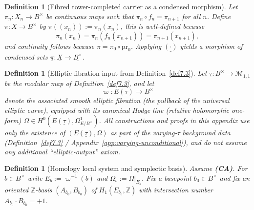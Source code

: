 \documentclass[11pt]{article}
\newtheorem{definition}[theorem]{Definition}
\theoremstyle{remark}
\begin{document}
{\begin{definition}[Fibred tower-completed carrier as a condensed morphism]\label{def:fibred_tower_condensed}
Let $\pi_n:X_n\to B^\times$ be continuous maps such that $\pi_n\circ f_n=\pi_{n+1}$ for all $n$. Define $\pi:X\to B^\times$ by $\pi((x_n)):=\pi_n(x_n)$, this is well-defined because
\begin{equation}\label{eq:pi_well_defined}
\pi_n(x_n)=\pi_n(f_n(x_{n+1}))=\pi_{n+1}(x_{n+1}),
\end{equation}
and continuity follows because $\pi=\pi_0\circ \mathrm{pr}_0$. Applying $\underline{(\cdot)}$ yields a morphism of condensed sets $\underline{\pi}:\underline{X}\to \underline{B^\times}$.
\end{definition} 
\begin{definition}[Elliptic fibration input from Definition~\eqref{def7.3}]\label{def:comparison_axiom_varying_tau}
Let $\underline{\tau}:B^\times\to \mathcal{M}_{1,1}$
be the modular map of Definition~\eqref{def7.3}, and let
\begin{equation}\label{eq:AppE-E-of-tau}
\varpi:E(\underline{\tau})\to B^\times
\end{equation}
denote the associated smooth elliptic fibration (the pullback of the universal elliptic curve), equipped with
its canonical Hodge line (relative holomorphic one-form) $\Omega\in H^0(E(\underline{\tau}),\Omega^1_{E/B^\times})$.
All constructions and proofs in this appendix use only the existence of $(E(\underline{\tau}),\Omega)$ as part of the
varying-$\tau$ background data (Definition~\eqref{def7.3} / Appendix~\eqref{app:varying-unconditional}), and do not assume any additional “elliptic-output”
axiom.
\end{definition}

\begin{definition}[Homology local system and symplectic basis]\label{def:homology_local_system}
Assume \textbf{(CA)}. For $b\in B^\times$ write $E_b:=\varpi^{-1}(b)$ and $\Omega_b:=\Omega|_{E_b}$. Fix a basepoint $b_0\in B^\times$ and fix an oriented $\mathbb{Z}$-basis $(A_{b_0},B_{b_0})$ of $H_1(E_{b_0},\mathbb{Z})$ with intersection number $A_{b_0}\cdot B_{b_0}=+1$.
\end{definition}

}
\end{document}
